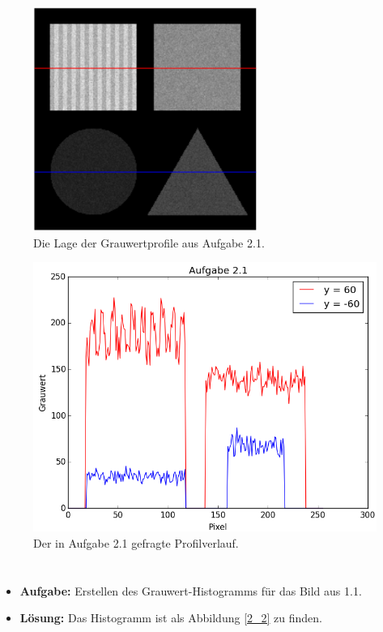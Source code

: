 \documentclass[12pt, a4paper, twoside]{report}
\begin{document}
\begin{figure}[h]
\centering
\includegraphics[width=0.65\textwidth]{../bilder/profillagen.png}
\caption{Die Lage der Grauwertprofile aus Aufgabe 2.1.}
\label{2_1_1}
\end{figure}

\begin{figure}[h]
\centering
\includegraphics[width=\textwidth]{../bilder/profile.png}
\caption{Der in Aufgabe 2.1 gefragte Profilverlauf.}
\label{2_1_2}
\end{figure}

\section{}
\begin{itemize}
\item \textbf{Aufgabe:} Erstellen des Grauwert-Histogramms für das Bild aus 1.1.
\item \textbf{Lösung:} Das Histogramm ist als Abbildung \ref{2_2} zu finden.
\end{itemize}
\end{document}

